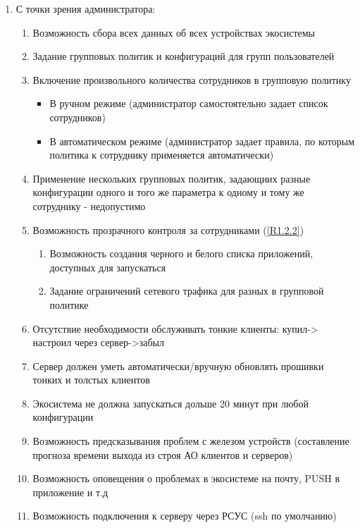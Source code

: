 \begin{enumerate}[label={\bfseries ПТ-\arabic*}]
   \item С точки зрения администратора:
         \begin{enumerate}[label*={\bfseries.\arabic*}]
            \item Возможность сбора всех данных об всех устройствах экосистемы
            \item Задание групповых политик и конфигураций для групп пользователей
            \item Включение произвольного количества сотрудников в групповую политику
                  \begin{itemize}
                     \item В ручном режиме (администратор самостоятельно задает список сотрудников)
                     \item В автоматическом режиме (администратор задает правила, по которым политика к сотруднику применяется автоматически)
                  \end{itemize}
            \item Применение нескольких групповых политик, задающиих разные конфигурации одного и того же параметра к одному и тому же сотруднику - недопустимо
            \item Возможность прозрачного контроля за сотрудниками (\ref{R1.2.2}) %
                  \begin{enumerate}[label*={\bfseries.\arabic*}]
                     \item Возможность создания черного и белого списка приложений, доступных для запускаться
                     \item Задание ограничений сетевого трафика для разных в групповой политике
                  \end{enumerate}
            \item Отсутствие необходимости обслуживать тонкие клиенты: купил-> настроил через сервер->забыл
            \item Сервер должен уметь автоматически/вручную обновлять прошивки тонких и толстых клиентов
            \item Экосистема не должна запускаться дольше 20 минут при любой конфигурации
            \item Возможность предсказывания проблем с железом устройств (составление прогноза времени выхода из строя АО клиентов и серверов)
            \item Возможность оповещения о проблемах в экосистеме на почту, PUSH в приложение и т.д
            \item Возможность подключения к серверу через РСУС (ssh по умолчанию)

\end{enumerate}
\end{enumerate}

